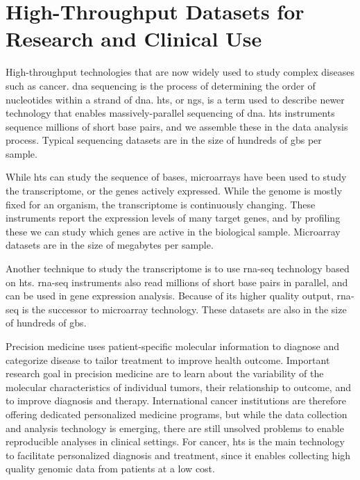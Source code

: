 \section{High-Throughput Datasets for Research and Clinical Use} 
High-throughput technologies that are now widely used to study complex diseases
such as cancer. \gls{dna} sequencing is the process of determining the order of
nucleotides within a strand of \gls{dna}. \gls{hts}, or \gls{ngs}, is a term
used to describe newer technology that enables massively-parallel sequencing of
\gls{dna}. \gls{hts} instruments sequence millions of short base pairs, and we
assemble these in the data analysis process. Typical sequencing datasets are in
the size of hundreds of \glspl{gb} per sample. 

While \gls{hts} can study the sequence of bases, microarrays have been used to
study the transcriptome, or the genes actively expressed. While the genome is
mostly fixed for an organism, the transcriptome is continuously changing. These
instruments report the expression levels of many target genes, and
by profiling these we can study which genes are active in the biological sample.
Microarray datasets are in the size of megabytes per sample. 

Another technique to study the transcriptome is to use \gls{rna}-seq technology
based on \gls{hts}. \gls{rna}-seq instruments also read millions of short base
pairs in parallel, and can be used in gene expression analysis. Because of its
higher quality output, \gls{rna}-seq is the successor to microarray technology.
These datasets are also in the size of hundreds of \glspl{gb}.

Precision medicine uses patient-specific molecular information to diagnose and
categorize disease to tailor treatment to improve health
outcome.\cite{national2011toward} Important research goal in precision medicine
are to learn about the variability of the molecular characteristics of
individual tumors, their relationship to outcome, and to improve diagnosis and
therapy.\cite{tannock2016limits} International cancer institutions are therefore
offering dedicated personalized medicine programs, but while the data collection
and analysis technology is emerging, there are still unsolved problems to enable
reproducible analyses in clinical settings. For cancer, \gls{hts}
is the main technology to facilitate personalized diagnosis and
treatment, since it enables collecting high quality genomic data from patients
at a low cost. 


